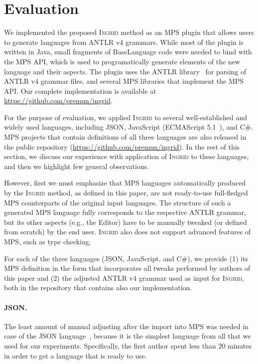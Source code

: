 \section{Evaluation}
\label{sect:EVAL}

We implemented the proposed \textsc{Ingrid} method as an MPS plugin that allows users to generate languages from ANTLR v4 grammars.
While most of the plugin is written in Java, small fragments of BaseLanguage code were needed to bind with the MPS API, which is used to programatically generate elements of the new language and their aspects.
The plugin uses the ANTLR library~\cite{ref:ANTLR} for parsing of ANTLR v4 grammar files, and several MPS libraries that implement the MPS API.
Our complete implementation is available at \url{https://github.com/premun/ingrid}.

For the purpose of evaluation, we applied \textsc{Ingrid} to several well-established and widely used languages, including JSON, JavaScript (ECMAScript 5.1~\cite{ref:ECMASCRIPT51}), and C\#.
MPS projects that contain definitions of all three languages are also released in the public repository (\url{https://github.com/premun/ingrid}).
In the rest of this section, we discuss our experience with application of \textsc{Ingrid} to these languages, and then we highlight few general observations.

However, first we must emphasize that MPS languages automatically produced by the \textsc{Ingrid} method, as defined in this paper, are not ready-to-use full-fledged MPS counterparts of the original input languages.
The structure of such a generated MPS language fully corresponds to the respective ANTLR grammar, but its other aspects (e.g., the Editor) have to be manually tweaked (or defined from scratch) by the end user.
\textsc{Ingrid} also does not support advanced features of MPS, such as type checking.

For each of the three languages (JSON, JavaScript, and C\#), we provide (1) its MPS definition in the form that incorporates all tweaks performed by authors of this paper and (2) the adjusted ANTLR v4 grammar used as input for \textsc{Ingrid}, both in the repository that contains also our implementation.

\paragraph{JSON.}
The least amount of manual adjusting after the import into MPS was needed in case of the JSON language~\cite{ref:JSON}, because it is the simplest language from all that we used for our experiments.
Specifically, the first author spent less than 20 minutes in order to get a language that is ready to use.

